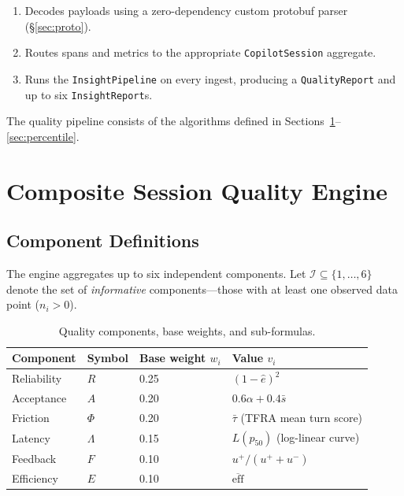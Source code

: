 \documentclass[11pt,a4paper]{article}
\newcommand{\calI}{\mathcal{I}}
\begin{document}
\begin{enumerate}
  \item Decodes payloads using a zero-dependency custom protobuf parser
        (\S\ref{sec:proto}).
  \item Routes spans and metrics to the appropriate \texttt{CopilotSession}
        aggregate.
  \item Runs the \texttt{InsightPipeline} on every ingest, producing a
        \texttt{QualityReport} and up to six \texttt{InsightReport}s.
\end{enumerate}

The quality pipeline consists of the algorithms defined in
Sections~\ref{sec:quality-engine}--\ref{sec:percentile}.

\section{Composite Session Quality Engine}
\label{sec:quality-engine}

\subsection{Component Definitions}

The engine aggregates up to six independent components.  Let
$\calI \subseteq \{1,\dots,6\}$ denote the set of \emph{informative}
components---those with at least one observed data point
($n_i > 0$).

\begin{table}[h!]
\centering
\caption{Quality components, base weights, and sub-formulas.}
\label{tab:components}
\begin{tabular}{@{}llll@{}}
\toprule
Component & Symbol & Base weight $w_i$ & Value $v_i$ \\
\midrule
Reliability & $R$    & 0.25 & $(1 - \hat{e})^2$ \\
Acceptance  & $A$    & 0.20 & $0.6\alpha + 0.4\bar{s}$ \\
Friction    & $\Phi$ & 0.20 & $\bar{\tau}$ (TFRA mean turn score) \\
Latency     & $\Lambda$ & 0.15 & $L(p_{50})$ (log-linear curve) \\
Feedback    & $F$    & 0.10 & $u^+ / (u^+ + u^-)$ \\
Efficiency  & $E$    & 0.10 & $\overline{\mathrm{eff}}$ \\
\bottomrule
\end{tabular}
\end{table}
\end{document}
